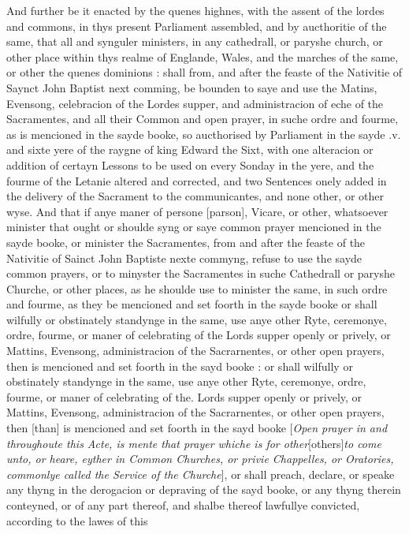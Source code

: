 And further be it enacted by the quenes highnes,
with the assent of the lordes and commons, in thys present Parliament
assembled, and by aucthoritie of the same, that all and synguler ministers,
in any cathedrall, or paryshe church, or other place within thys realme
of Englande, Wales, and the marches of the same, or other the quenes
dominions : shall from, and after the feaste of the Nativitie of Saynct
John Baptist next comming, be bounden to saye and use the Matins, Evensong,
celebracion of the Lordes supper, and administracion of eche of the
Sacramentes, and all their Common and open prayer, in suche ordre and
fourme, as is mencioned in the sayde booke, so aucthorised by Parliament
in the sayde .v. and sixte yere of the raygne of king Edward the Sixt,
with one alteracion or addition of certayn Lessons to be used on every
Sonday in the yere, and the fourme of the Letanie altered and corrected,
and two Sentences onely added in the delivery of the Sacrament to the
communicantes, and none other, or other wyse. And that if anye maner
of persone [parson], Vicare,
or other, whatsoever minister that ought or shoulde syng or saye common
prayer mencioned in the sayde booke, or minister the Sacramentes, from
and after the feaste of the Nativitie of Sainct John Baptiste nexte
commyng, refuse to use the sayde common prayers, or to minyster the
Sacramentes in suche Cathedrall or paryshe Churche, or other places,
as he shoulde use to minister the same, in such ordre and fourme, as
they be mencioned and set foorth in the sayde booke or shall wilfully
or obstinately standynge in the same, use anye other Ryte, ceremonye,
ordre, fourme, or maner of celebrating of the Lords supper openly or
prively, or Mattins, Evensong, administracion of the Sacrarnentes, or
other open prayers, then is mencioned and set foorth in the sayd booke
: or shall wilfully or obstinately standynge in the same, use anye other
Ryte, ceremonye, ordre, fourme, or maner of celebrating of the. Lords
supper openly or prively, or Mattins, Evensong, administracion of the
Sacrarnentes, or other open prayers, then [than]
is mencioned and set foorth in the sayd booke [\emph{Open prayer in and
throughoute this Acte, is mente that prayer whiche is for other}[others]\emph{to come unto, or heare, eyther in Common Churches, or privie Chappelles,
or Oratories, commonlye called the Service of the Churche}], or shall
preach, declare, or speake any thyng in the derogacion or depraving
of the sayd booke, or any thyng therein conteyned, or of any part thereof,
and shalbe thereof lawfullye convicted, according to the lawes of this
